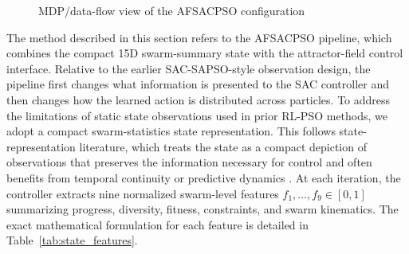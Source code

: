 \documentclass[final,5p,times]{elsarticle}
\begin{document}
\begin{figure}[!t]
{%
}
\caption{MDP/data-flow view of the AFSACPSO configuration}
\label{fig:mdp_components}
\end{figure}

The method described in this section refers to the AFSACPSO pipeline, which combines the compact 15D swarm-summary state with the attractor-field control interface. Relative to the earlier SAC-SAPSO-style observation design, the pipeline first changes what information is presented to the SAC controller and then changes how the learned action is distributed across particles.
To address the limitations of static state observations used in prior RL-PSO methods, we adopt a compact swarm-statistics state representation. This follows state-representation literature, which treats the state as a compact depiction of observations that preserves the information necessary for control and often benefits from temporal continuity or predictive dynamics \cite{Lesort2018State}.
At each iteration, the controller extracts nine normalized swarm-level features $f_1, \dots, f_9 \in [0,1]$ summarizing progress, diversity, fitness, constraints, and swarm kinematics. The exact mathematical formulation for each feature is detailed in Table~\ref{tab:state_features}.
\end{document}
